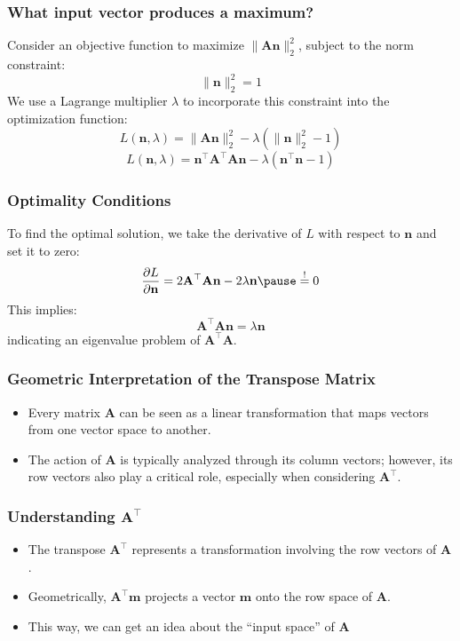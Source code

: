 \documentclass[aspectratio=169]{beamer}
\begin{document}
\begin{frame}
\frametitle{What input vector produces a maximum?}
Consider an objective function to maximize \( \| \mathbf{A} \mathbf{n} \|_2^2\), subject to the norm constraint:
\[
\|\mathbf{n}\|_2^2 = 1
\] \pause
We use a Lagrange multiplier \( \lambda \) to incorporate this constraint into the optimization function:
\[
L(\mathbf{n}, \lambda) = \| \mathbf{A} \mathbf{n} \|_2^2 - \lambda (\|\mathbf{n}\|_2^2 - 1)
\]
\pause
\[
L(\mathbf{n}, \lambda) = \mathbf{n}^\top \mathbf{A}^\top \mathbf{A} \mathbf{n} - \lambda (\mathbf{n}^\top \mathbf{n} - 1)
\]

\end{frame}

\begin{frame}
\frametitle{Optimality Conditions}
To find the optimal solution, we take the derivative of \( L \) with respect to \( \mathbf{n} \) and set it to zero:
\[
\frac{\partial L}{\partial \mathbf{n}} = 2 \mathbf{A}^\top \mathbf{A} \mathbf{n} - 2 \lambda \mathbf{n} \pause \overset{!}{=} 0
\] \pause
This implies:
\[
\mathbf{A}^\top \mathbf{A} \mathbf{n} = \lambda \mathbf{n}
\] \pause
indicating an eigenvalue problem of $\mathbf{A}^\top \mathbf{A}$.
\end{frame}


\begin{frame}
\frametitle{Geometric Interpretation of the Transpose Matrix}
\begin{itemize}
    \item Every matrix \( \mathbf{A} \) can be seen as a linear transformation that maps vectors from one vector space to another.
    \item The action of \( \mathbf{A} \) is typically analyzed through its column vectors; however, its row vectors also play a critical role, especially when considering \( \mathbf{A}^\top \).
\end{itemize}
\end{frame}

\begin{frame}
\frametitle{Understanding \( \mathbf{A}^\top \)}
\pause
\begin{itemize}
    \item The transpose \( \mathbf{A}^\top \) represents a transformation involving the row vectors of \( \mathbf{A} \).
    \item Geometrically, \( \mathbf{A}^\top \mathbf{m} \) projects a vector \( \mathbf{m} \) onto the row space of \( \mathbf{A} \).
    \item This way, we can get an idea about the ``input space'' of $\mathbf{A}$
\end{itemize}
\end{frame}
\end{document}

